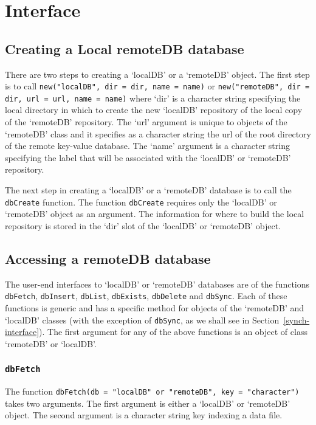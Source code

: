 \documentclass{article}
\newcommand{\code}{\texttt}
\begin{document}
\section{Interface}

\subsection{Creating a Local remoteDB database}

There are two steps to creating a `localDB' or a `remoteDB'
object. The first step is to call \code{new("localDB", dir = dir, name = name)} 
or \code{new("remoteDB", dir = dir, url = url, name = name)} where 
`dir' is a character string specifying the local directory in which to 
create the new `localDB' repository of the local copy of the 
`remoteDB' repository. The `url' argument is unique to objects of the 
`remoteDB' class and it specifies as a character string the url 
of the root directory of the remote key-value database. The `name' 
argument is a character string specifying the label that will be associated with
the `localDB' or `remoteDB' repository.  

The next step in creating a `localDB' or a `remoteDB' 
database is to call the \code{dbCreate} function.  The function \code{dbCreate} 
requires only the `localDB' or `remoteDB' object as an argument. The
information for where to build the local repository is stored in the `dir' slot
of the `localDB' or `remoteDB' object.


\subsection{Accessing a remoteDB database}

The user-end interfaces to `localDB' or `remoteDB' databases 
are of the functions \code{dbFetch}, \code{dbInsert}, \code{dbList}, 
\code{dbExists}, \code{dbDelete} and \code{dbSync}.  Each of these functions 
is generic and has a specific method for objects of the 
`remoteDB' and `localDB' classes (with the exception of \code{dbSync}, 
as we shall see in Section~\ref{synch-interface}). The first argument for any of the 
above functions is an object of class `remoteDB' or `localDB'.

\subsubsection{\code{dbFetch}}

The function \code{dbFetch(db = "localDB" or "remoteDB", 
key = "character")} takes two arguments. The first argument is either a 
`localDB' or `remoteDB' object. The second argument is a 
character string key indexing a data file. 
\end{document}
